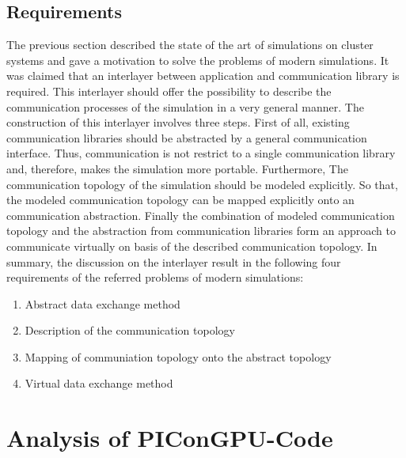 \subsection{Requirements}
\label{sec:requirements}

The previous section described the state of the art of simulations on
cluster systems and gave a motivation to solve the problems of modern
simulations. It was claimed that an interlayer between application and
communication library is required.  This interlayer should offer the
possibility to describe the communication processes of the simulation
in a very general manner.  The construction of this interlayer
involves three steps.  First of all, existing communication libraries
should be abstracted by a general communication interface. Thus,
communication is not restrict to a single communication library and,
therefore, makes the simulation more portable.  Furthermore, The
communication topology of the simulation should be modeled explicitly.
So that, the modeled communication topology can be mapped explicitly
onto an communication abstraction.  Finally the combination of modeled
communication topology and the abstraction from communication
libraries form an approach to communicate virtually on basis of the
described communication topology.  In summary, the discussion on the
interlayer result in the following four requirements of the referred
problems of modern simulations:

\begin{enumerate}
\item Abstract data exchange method
\item Description of the communication topology
\item Mapping of communiation topology onto the abstract topology
\item Virtual data exchange method 
\end{enumerate}


\section{Analysis of PIConGPU-Code}
\label{sec:picongpu_analysis}


